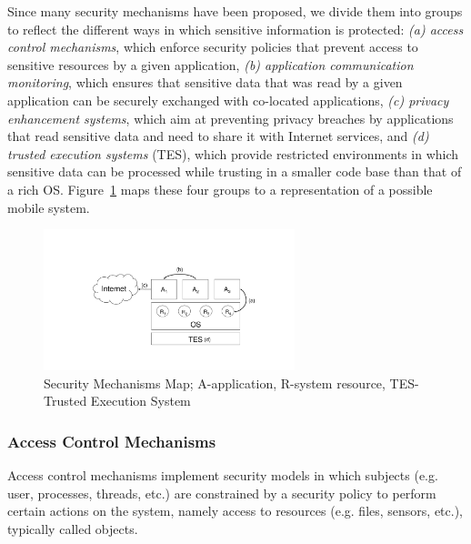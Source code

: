Since many security mechanisms have been proposed, we divide them into groups to reflect the different ways in which sensitive information is protected: \emph{(a) access control mechanisms}, which enforce security policies that prevent access to sensitive resources by a given application, \emph{(b) application communication monitoring}, which ensures that sensitive data that was read by a given application can be securely exchanged with co-located applications, \emph{(c) privacy enhancement systems}, which aim at preventing privacy breaches by applications that read sensitive data and need to share it with Internet services, and \emph{(d) trusted execution systems} (TES), which provide restricted environments in which sensitive data can be processed while trusting in a smaller code base than that of a rich OS. Figure~\ref{fig:relwork} maps these four groups to a representation of a possible mobile system. 

\begin{figure}[t!]
	\centering
	\includegraphics[width=0.65\textwidth]{img/relwork.pdf}
	\caption{Security Mechanisms Map; A-application, R-system resource, TES-Trusted Execution System}
	\label{fig:relwork}
\end{figure}

\subsubsection{Access Control Mechanisms}
\label{sec:accesscontrol}

Access control mechanisms implement security models in which subjects (e.g. user, processes, threads, etc.) are constrained by a security policy to perform certain actions on the system, namely access to resources (e.g. files, sensors, etc.), typically called objects.

